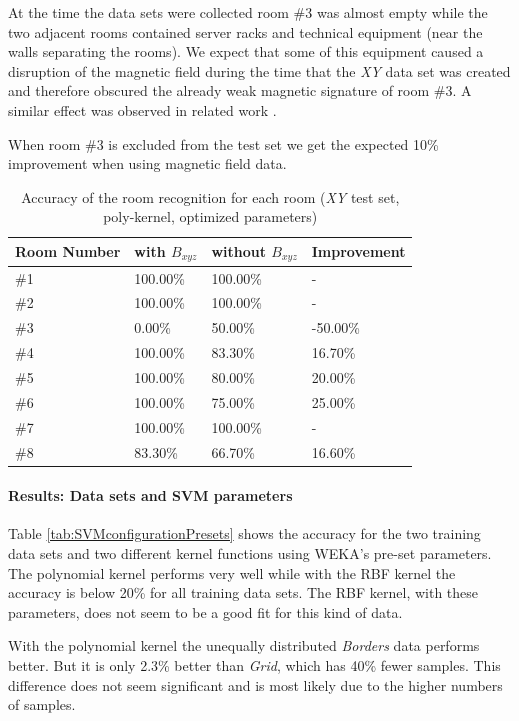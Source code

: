 At the time the data sets were collected room \#3 was almost empty while the two adjacent rooms contained server racks and technical equipment (near the walls separating the rooms). We expect that some of this equipment caused a disruption of the magnetic field during the time that the \emph{XY} data set was created and therefore obscured the already weak magnetic signature of room \#3. A similar effect was observed in related work \citep{Li2012feasableMagnetic}.

When room \#3 is excluded from the test set we get the expected 10\% improvement when using magnetic field data.

\begin{table}
\centering
\begin{tabular}{l l l l}
\toprule
\textbf{Room Number}&\textbf{with }\boldmath$B_{xyz}$&\textbf{without }\boldmath$B_{xyz}$&\textbf{Improvement} \\
\midrule
\#1&100.00\%&100.00\%&-\\
\#2&100.00\%&100.00\%&-\\
\#3&0.00\%&50.00\%&-50.00\%\\
\#4&100.00\%&83.30\%&16.70\%\\
\#5&100.00\%&80.00\%&20.00\%\\
\#6&100.00\%&75.00\%&25.00\%\\
\#7&100.00\%&100.00\%&-\\
\#8&83.30\%&66.70\%&16.60\%\\
\bottomrule
\end{tabular}
\caption[Room Recognition - Accuracy per room]{Accuracy of the room recognition for each room (\emph{XY} test set, poly-kernel, optimized parameters)}
\label{tab:RoomRecognitionPerRoom}
\end{table}

\paragraph{Results: Data sets and SVM parameters}

Table \ref{tab:SVMconfigurationPresets} shows the accuracy for the two training data sets and two different kernel functions using WEKA's pre-set parameters. The polynomial kernel performs very well while with the RBF kernel the accuracy is below 20\% for all training data sets. The RBF kernel, with these parameters, does not seem to be a good fit for this kind of data.

With the polynomial kernel the unequally distributed \emph{Borders} data performs better. But it is only 2.3\% better than \emph{Grid}, which has 40\% fewer samples. This difference does not seem significant and is most likely due to the higher numbers of samples.

